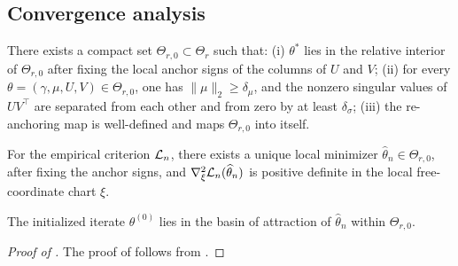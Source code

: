 \documentclass{article}
\begin{document}
\begin{bibunit}[unsrtnat]
\subsection{Convergence analysis}\label{app:est:subsec:conv}

\begin{assumption}
\label{asm:algo-chart}
There exists a compact set $\Theta_{r,0}\subset \Theta_r$ such that:
(i) $\theta^\ast$ lies in the relative interior of $\Theta_{r,0}$ after fixing the local anchor signs of the columns of $U$ and $V$;
(ii) for every $\theta=(\gamma,\mu,U,V)\in\Theta_{r,0}$, one has $\|\mu\|_2\ge \delta_\mu$, and the nonzero singular values of $UV^\top$ are separated from each other and from zero by at least $\delta_\sigma$;
(iii) the re-anchoring map is well-defined and maps $\Theta_{r,0}$ into itself.
\end{assumption}

\begin{assumption}
\label{asm:algo-local-min}
For the empirical criterion $\mathcal{L}_n$, there exists a unique local minimizer $\hat\theta_n\in\Theta_{r,0}$, after fixing the anchor signs, and $\nabla_\xi^2 \mathcal{L}_n(\widehat\theta_n)$ is positive definite in the local free-coordinate chart $\xi$.
\end{assumption}

\begin{assumption}
\label{asm:algo-init}
The initialized iterate $\theta^{(0)}$ lies in the basin of attraction of $\hat\theta_n$ within $\Theta_{r,0}$.
\end{assumption}


\begin{proof}[Proof of ]
    The proof of  follows from .
\end{proof}


\end{bibunit}
\end{document}
